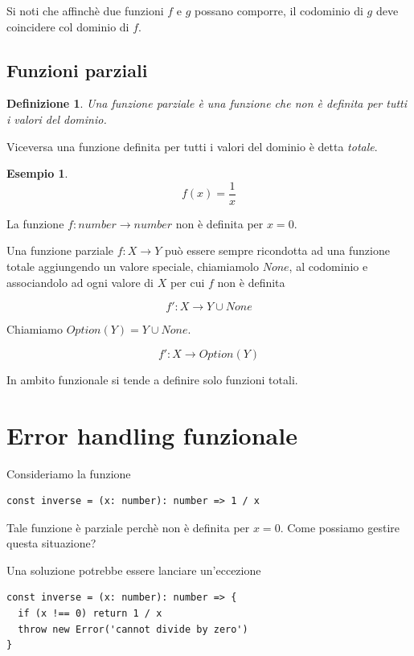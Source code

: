 \documentclass[12pt]{article}
\newtheorem{definition}{Definizione}
\newtheorem{example}{Esempio}
\begin{document}
Si noti che affinchè due funzioni $f$ e $g$ possano comporre, il codominio di $g$ deve coincidere col dominio di $f$.

\subsection{Funzioni parziali}

\begin{definition}
Una funzione \emph{parziale} è una funzione che non è definita per tutti i valori del dominio.
\end{definition}

Viceversa una funzione definita per tutti i valori del dominio è detta \emph{totale}.

\begin{example}
$$
f(x) = \frac{1}{x}
$$
\end{example}

La funzione $f: number \rightarrow number$ non è definita per $x = 0$.

Una funzione parziale $f: X \rightarrow Y$ può essere sempre ricondotta ad una funzione totale aggiungendo un valore speciale,
chiamiamolo $None$, al codominio e associandolo ad ogni valore di $X$ per cui $f$ non è definita

$$
f': X \rightarrow Y \cup None
$$

Chiamiamo $Option(Y) = Y \cup None$.

$$
f': X \rightarrow Option(Y)
$$

In ambito funzionale si tende a definire solo funzioni totali.

\newpage

\section{Error handling funzionale}

Consideriamo la funzione

\begin{verbatim}
const inverse = (x: number): number => 1 / x
\end{verbatim}

Tale funzione è parziale perchè non è definita per $x = 0$. Come possiamo gestire questa situazione?

Una soluzione potrebbe essere lanciare un'eccezione

\begin{verbatim}
const inverse = (x: number): number => {
  if (x !== 0) return 1 / x
  throw new Error('cannot divide by zero')
}
\end{verbatim}
\end{document}
